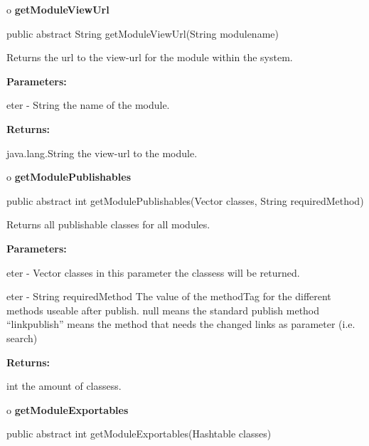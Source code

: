 o {\bf getModuleViewUrl} 

\begin{PRE}
 public abstract String getModuleViewUrl(String modulename)
\end{PRE}

\begin{description}
\htmlDD Returns the url to the view-url for the module within the system. 

\begin{description}
\item {\bf Parameters:}  

eter - String the name of the module.  
\item {\bf Returns:}  

java.lang.String the view-url to the module.  
\end{description}

\end{description}

o {\bf getModulePublishables} 

\begin{PRE}
 public abstract int getModulePublishables(Vector classes,
                                           String requiredMethod)
\end{PRE}

\begin{description}
\htmlDD Returns all publishable classes for all modules. 

\begin{description}
\item {\bf Parameters:}  

eter - Vector classes in this parameter the classess will be returned.  

eter - String requiredMethod The value of the methodTag for the different 
methods useable after publish.  null means the standard publish method 
``linkpublish'' means the method that needs the changed links as parameter
(i.e. search)  
\item {\bf Returns:}  

int the amount of classess.  
\end{description}

\end{description}

o {\bf getModuleExportables} 

\begin{PRE}
 public abstract int getModuleExportables(Hashtable classes)
\end{PRE}

